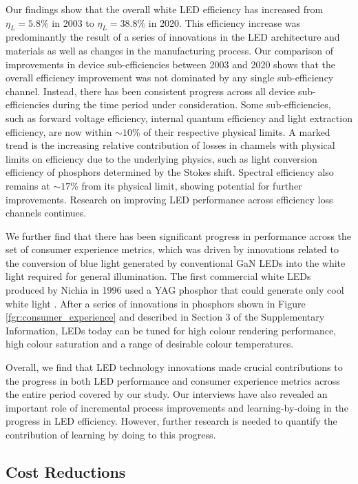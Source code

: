 \documentclass[journal=jacsat,manuscript=article]{achemso}
\begin{document}
Our findings show that the overall white LED efficiency has increased from $\eta_L=5.8\%$ in 2003 to $\eta_L=38.8\%$ in 2020. This efficiency increase was predominantly the result of a series of innovations in the LED architecture and materials as well as changes in the manufacturing process. Our comparison of improvements in device sub-efficiencies between 2003 and 2020 shows that the overall efficiency improvement was not dominated by any single sub-efficiency channel. Instead, there has been consistent progress across all device sub-efficiencies during the time period under consideration. Some sub-efficiencies, such as forward voltage efficiency, internal quantum efficiency and light extraction efficiency, are now within $\sim10\%$ of their respective physical limits. A marked trend is the increasing relative contribution of losses in channels with physical limits on efficiency due to the underlying physics, such as light conversion efficiency of phosphors determined by the Stokes shift. Spectral efficiency also remains at $\sim17\%$ from its physical limit, showing potential for further improvements. Research on improving LED performance across efficiency loss channels continues\cite{cho2017white,Weisbuch2020}.

We further find that there has been significant progress in performance across the set of consumer experience metrics, which was driven by innovations related to the conversion of blue light generated by conventional GaN LEDs into the white light required for general illumination. The first commercial white LEDs produced by Nichia in 1996 used a YAG phosphor that could generate only cool white light \cite{bando1998development}. After a series of innovations in phosphors shown in Figure \ref{fgr:consumer_experience} and described in Section 3 of the Supplementary Information, LEDs today can be tuned for high colour rendering performance, high colour saturation and a range of desirable colour temperatures. 

Overall, we find that LED technology innovations made crucial contributions to the progress in both LED performance and consumer experience metrics across the entire period covered by our study. Our interviews have also revealed an important role of incremental process improvements and learning-by-doing\cite{WRIGHT_1936,Arrow_1962} in the progress in LED efficiency. However, further research is needed to quantify the contribution of learning by doing to this progress.

\subsection{Cost Reductions}
\end{document}
